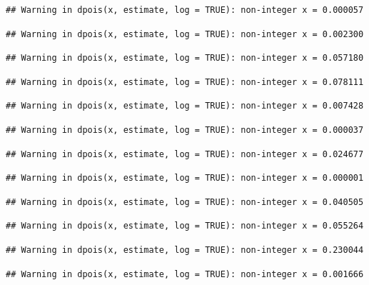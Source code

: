 \documentclass[]{article}
\begin{document}
\begin{verbatim}
## Warning in dpois(x, estimate, log = TRUE): non-integer x = 0.000057
\end{verbatim}

\begin{verbatim}
## Warning in dpois(x, estimate, log = TRUE): non-integer x = 0.002300
\end{verbatim}

\begin{verbatim}
## Warning in dpois(x, estimate, log = TRUE): non-integer x = 0.057180
\end{verbatim}

\begin{verbatim}
## Warning in dpois(x, estimate, log = TRUE): non-integer x = 0.078111
\end{verbatim}

\begin{verbatim}
## Warning in dpois(x, estimate, log = TRUE): non-integer x = 0.007428
\end{verbatim}

\begin{verbatim}
## Warning in dpois(x, estimate, log = TRUE): non-integer x = 0.000037
\end{verbatim}

\begin{verbatim}
## Warning in dpois(x, estimate, log = TRUE): non-integer x = 0.024677
\end{verbatim}

\begin{verbatim}
## Warning in dpois(x, estimate, log = TRUE): non-integer x = 0.000001
\end{verbatim}

\begin{verbatim}
## Warning in dpois(x, estimate, log = TRUE): non-integer x = 0.040505
\end{verbatim}

\begin{verbatim}
## Warning in dpois(x, estimate, log = TRUE): non-integer x = 0.055264
\end{verbatim}

\begin{verbatim}
## Warning in dpois(x, estimate, log = TRUE): non-integer x = 0.230044
\end{verbatim}

\begin{verbatim}
## Warning in dpois(x, estimate, log = TRUE): non-integer x = 0.001666
\end{verbatim}
\end{document}
